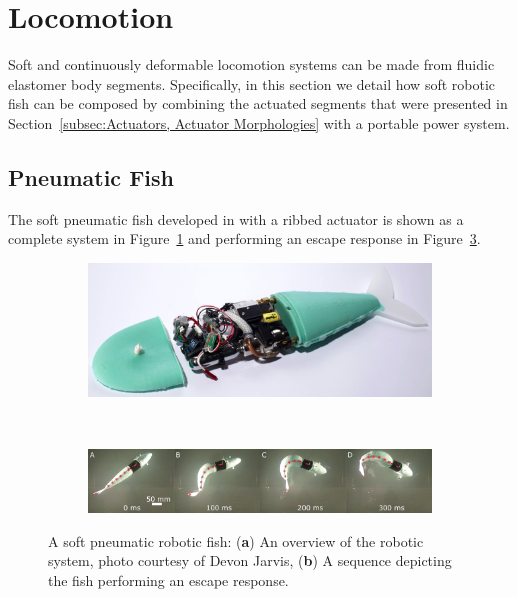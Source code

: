 \section{Locomotion}
\label{sec:Locomotion}
Soft and continuously deformable locomotion systems can be made from fluidic elastomer body segments.
Specifically, in this section we detail how soft robotic fish can be composed by combining the actuated segments that were presented in Section~\ref{subsec:Actuators, Actuator Morphologies} with a portable power system.

\subsection{Pneumatic Fish}
\label{subsec:Locomotion, Pneumatic Fish}
The soft pneumatic fish developed in \cite{marchese2014autonomous} with a ribbed actuator is shown as a complete system in Figure~\ref{fig:pneumaticfish_system} and performing an escape response in Figure~\ref{fig:pneumaticfish_escape}.

\begin{figure}[htb]
        \centering
        \begin{subfigure}[b]{\columnwidth}
            \centering
            \includegraphics[width=0.9\columnwidth]{Figures/locomotion/pneumaticfish_system.png}
            \caption{}
            \label{fig:pneumaticfish_system}
        \end{subfigure}\\
        \begin{subfigure}[b]{\columnwidth}
            \centering
            \includegraphics[width=0.9\columnwidth]{Figures/locomotion/pneumaticfish_escape_half.pdf}
            \caption{}
            \label{fig:pneumaticfish_escape}
        \end{subfigure}%
        \caption[Pneumatic Fish.]{A soft pneumatic robotic fish: (\textbf{a}) An overview of the robotic system, photo courtesy of Devon Jarvis, (\textbf{b}) A sequence depicting the fish performing an escape response.}
\end{figure}



